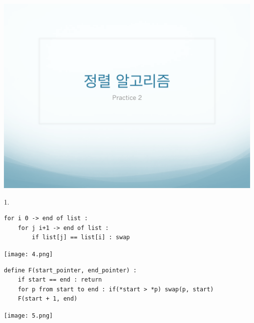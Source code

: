 \documentclass[12pt,a4paper]{article}
\begin{document}
\includegraphics[page=9, width=\textwidth]{1.pdf}

1. 
\begin{lstlisting}[mathescape]
for i 0 -> end of list :
	for j i+1 -> end of list :
		if list[j] == list[i] : swap 
\end{lstlisting}

\texttt{[image: 4.png]}

\begin{lstlisting}[mathescape]
define F(start_pointer, end_pointer) :
	if start == end : return
	for p from start to end : if(*start > *p) swap(p, start)
	F(start + 1, end)
\end{lstlisting}

\texttt{[image: 5.png]}
\end{document}

